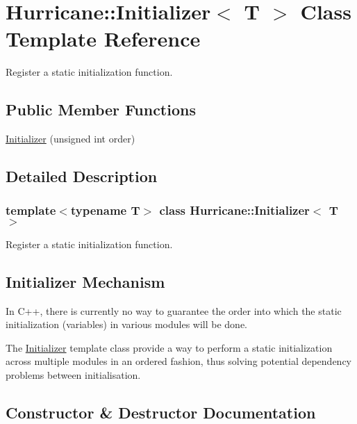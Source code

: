 \hypertarget{classHurricane_1_1Initializer}{}\section{Hurricane\+:\+:Initializer$<$ T $>$ Class Template Reference}
\label{classHurricane_1_1Initializer}


Register a static initialization function.  


\subsection*{Public Member Functions}
\begin{DoxyCompactItemize}
\item 
\mbox{\hyperlink{classHurricane_1_1Initializer_ab80fdb7c17aaf5bd3facdf3f0f9d12ae}{Initializer}} (unsigned int order)
\end{DoxyCompactItemize}


\subsection{Detailed Description}
\subsubsection*{template$<$typename T$>$\newline
class Hurricane\+::\+Initializer$<$ T $>$}

Register a static initialization function. 

\hypertarget{classHurricane_1_1Initializer_secInitializerMechanism}{}\subsection{Initializer Mechanism}\label{classHurricane_1_1Initializer_secInitializerMechanism}
In C++, there is currently no way to guarantee the order into which the static initialization (variables) in various modules will be done.

The \mbox{\hyperlink{classHurricane_1_1Initializer}{Initializer}} template class provide a way to perform a static initialization across multiple modules in an ordered fashion, thus solving potential dependency problems between initialisation. 

\subsection{Constructor \& Destructor Documentation}
\mbox{\label{classHurricane_1_1Initializer_ab80fdb7c17aaf5bd3facdf3f0f9d12ae}} 
